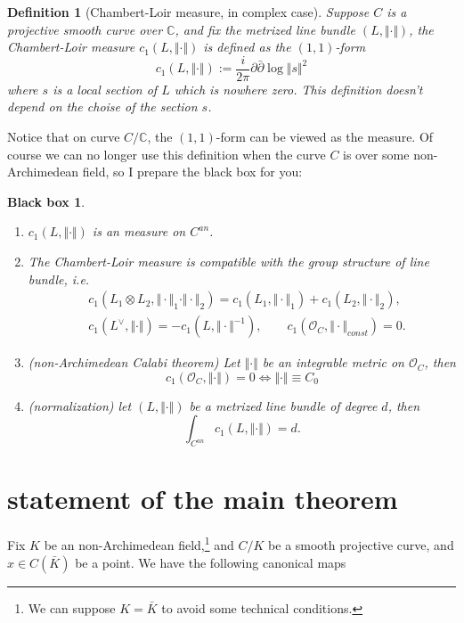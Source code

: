 \documentclass[reqno,11pt]{amsart}
\numberwithin{equation}{section}
\theoremstyle{plain}
\newtheorem{defn}[theorem]{Definition}
\newtheorem*{bbox}{Black box}
\theoremstyle{plain}
\numberwithin{equation}{section}
\theoremstyle{remark}
\newcommand{\norm}[1]{\Vert{#1}\Vert}
\begin{document}
\begin{defn}[Chambert-Loir measure, in complex case]
Suppose $C$ is a projective smooth curve over $\mathbb{C}$, and fix the metrized line bundle $(L,\norm{\cdot})$, the Chambert-Loir measure $c_1(L,\norm{\cdot})$ is defined as the $(1,1)$-form
$$c_1(L,\norm{\cdot}):= \frac{i}{2\pi}\partial\bar{\partial} \log \norm{s}^2$$
where $s$ is a local section of $L$ which is nowhere zero.  This definition doesn't depend on the choise of the section $s$.
\end{defn}
Notice that on curve $C/\mathbb{C}$, the $(1,1)$-form can be viewed as the measure. Of course we can no longer use this definition when the curve $C$ is over some non-Archimedean field, so I prepare the black box for you:
\begin{bbox}\
\begin{enumerate}[(1)]
\item $c_1(L,\norm{\cdot})$ is an measure on $C^{an}$.
\item The Chambert-Loir measure is compatible with the group structure of line bundle, i.e.
\begin{equation*}
\begin{aligned}
  &c_1(L_1\otimes L_2,\norm{\cdot}_1\cdot \norm{\cdot}_2)=c_1(L_1,\norm{\cdot}_1)+c_1(L_2,\norm{\cdot}_2),  \\
   &c_1(L^{\vee},\norm{\cdot})=-c_1(L,\norm{\cdot}^{-1}),\quad\quad c_1(\mathcal{O}_C,\norm{\cdot}_{const})=0.
\end{aligned}
\end{equation*}
\item (non-Archimedean Calabi theorem) Let $\norm{\cdot}$ be an integrable metric on $\mathcal{O}_C$, then
$$c_1(\mathcal{O}_C,\norm{\cdot})=0 \iff \norm{\cdot} \equiv C_0 $$
\item (normalization) let $(L,\norm{\cdot})$ be a metrized line bundle of degree $d$, then
$$\int_{C^{an}} c_1(L,\norm{\cdot})=d.$$
\end{enumerate}
\end{bbox}
\section{statement of the main theorem}
Fix $K$ be an non-Archimedean field,\footnote{We can suppose $K=\bar{K}$ to avoid some technical conditions.} and $C/K$ be a smooth projective curve, and $x\in C(\bar{K})$ be a point. We have the following canonical maps
\end{document}
